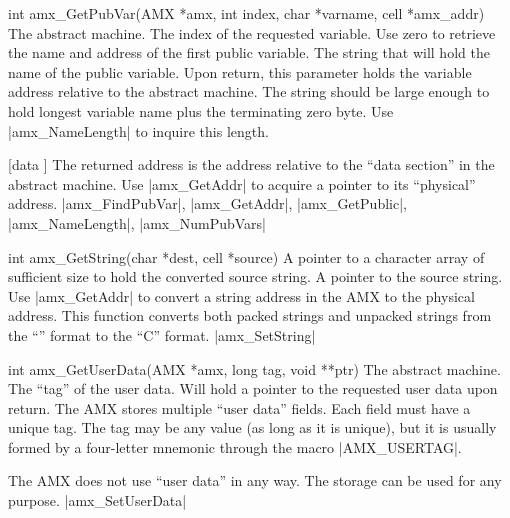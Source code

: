 \syntaxp int amx_GetPubVar(AMX *amx, int index, char *varname, cell *amx_addr)
        The abstract machine.
        The index of the requested variable. Use zero to retrieve the name and
        address of the first public variable.
        The string that will hold the name of the public variable.
        Upon return, this parameter holds the variable address relative to
        the abstract machine.
\notes
    The string should be large enough to hold longest variable name plus the
    terminating zero byte. Use |amx_NameLength| to inquire this length.

     [data \midtilde]
    The returned address is the address relative to the ``data section''
    in the abstract machine. Use |amx_GetAddr| to acquire a pointer to its
    ``physical'' address.
\seealso
    |amx_FindPubVar|, |amx_GetAddr|, |amx_GetPublic|, \lbreak
    |amx_NameLength|, |amx_NumPubVars|

\syntaxp int amx_GetString(char *dest, cell *source)
        A pointer to a character array of sufficient size to hold the
        converted source string.
        A pointer to the source string. Use |amx_GetAddr| to convert a
        string address in the AMX to the physical address.
\notes
    This function converts both packed strings and unpacked strings from
    the ``\Small'' format to the ``C'' format.
\seealso |amx_SetString|

\syntaxp int amx_GetUserData(AMX *amx, long tag, void **ptr)
        The abstract machine.
        The ``tag'' of the user data.
        Will hold a pointer to the requested user data upon return.
\notes
    The AMX stores multiple ``user data'' fields. Each field must have a unique
    tag. The tag may be any value (as long as it is unique), but it is usually
    formed by a four-letter mnemonic through the macro |AMX_USERTAG|.

    The AMX does not use ``user data'' in any way. The storage can be used for
    any purpose.
\seealso
    |amx_SetUserData|

